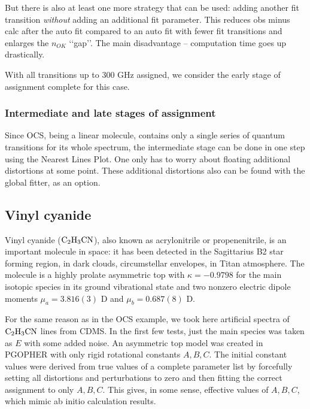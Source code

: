 \documentclass[11pt]{article}
\begin{document}
But there is also at least one more strategy that can be used: adding another fit transition \emph{without} adding an additional fit parameter. This reduces obs minus calc after the auto fit compared to an auto fit with fewer fit transitions and enlarges the $n_{OK}$ \lq\lq{}gap\rq\rq{}. The main disadvantage -- computation time goes up drastically. %


With all transitions up to 300 GHz assigned, we consider the early stage of assignment complete for this case.

\subsubsection{Intermediate and late stages of assignment}

Since OCS, being a linear molecule, contains only a single series of quantum transitions for its whole spectrum, the intermediate stage can be done in one step using the Nearest Lines Plot. One only has to worry about floating additional distortions at some point. These additional distortions also can be found with the global fitter, as an option.

\subsection{Vinyl cyanide}

Vinyl cyanide ($\rm C_2H_3CN$), also known as acrylonitrile or propenenitrile, is an important molecule in space: it has been detected in the Sagittarius B2 star forming region, in dark clouds, circumstellar envelopes, in Titan atmosphere. The molecule is a highly prolate asymmetric top with $\kappa = -0.9798$ for the main isotopic species in its ground vibrational state and two nonzero electric dipole moments $\mu_a = 3.816(3)$ D and $\mu_b = 0.687(8)$ D.  


For the same reason as in the OCS example, we took here artificial spectra of $\rm C_2H_3CN$ lines from CDMS. In the first few tests, just the main species was taken as $E$ with some added noise. An asymmetric top model was created in PGOPHER with only rigid rotational constants $A, B, C$. The initial constant values were derived from true values of a complete parameter list by forcefully setting all distortions and perturbations to zero and then fitting the correct assignment to only $A, B, C$. This gives, in some sense, effective values of $A, B, C$, which mimic ab initio calculation results. %
\end{document}
